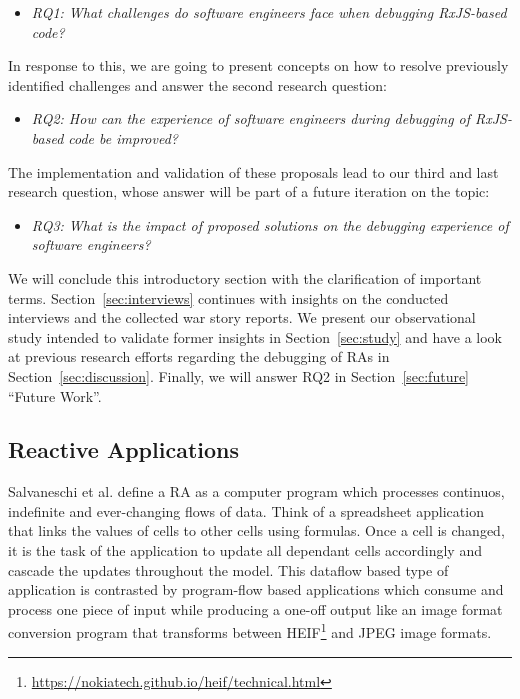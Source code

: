 \documentclass[12pt,a4paper]{article}
\begin{document}
\begin{itemize}
	\item \emph{RQ1: What challenges do software engineers face when debugging RxJS-based code?}
\end{itemize}

In response to this, we are going to present concepts on how to resolve previously identified challenges and answer the second research question:

\begin{itemize}
	\item \emph{RQ2: How can the experience of software engineers during debugging of RxJS-based code be improved?}
\end{itemize}

The implementation and validation of these proposals lead to our third and last research question, whose answer will be part of a future iteration on the topic:

\begin{itemize}
	\item \emph{RQ3: What is the impact of proposed solutions on the debugging experience of software engineers?}
\end{itemize}

We will conclude this introductory section with the clarification of important terms. Section~\ref{sec:interviews} continues with insights on the conducted interviews and the collected war story reports. We present our observational study intended to validate former insights in Section~\ref{sec:study} and have a look at previous research efforts regarding the debugging of RAs in Section~\ref{sec:discussion}. Finally, we will answer RQ2 in Section~\ref{sec:future} ``Future Work''.

\subsection{Reactive Applications}

Salvaneschi et al. \cite{7827078} define a RA as a computer program which processes continuos, indefinite and ever-changing flows of data. Think of a spreadsheet application\cite{10.1145/2501654.2501666} that links the values of cells to other cells using formulas. Once a cell is changed, it is the task of the application to update all dependant cells accordingly and cascade the updates throughout the model. This dataflow based type of application is contrasted by program-flow based applications which consume and process one piece of input while producing a one-off output like an image format conversion program that transforms between HEIF\footnote{\url{https://nokiatech.github.io/heif/technical.html}} and JPEG image formats.
\end{document}
